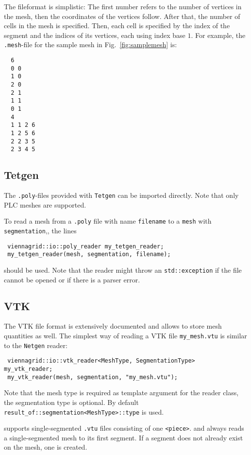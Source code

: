  The fileformat is simplistic: The first number refers to the number of vertices in the mesh, then the coordinates of the vertices follow. After that, the number of cells in the mesh is specified. Then, each cell is specified by the index of the segment and the indices of its vertices, each using index base $1$.
 For example, the \texttt{.mesh}-file for the sample mesh in Fig.~\ref{fig:samplemesh} is:
 \begin{verbatim}
  6
  0 0
  1 0
  2 0
  2 1
  1 1
  0 1
  4
  1 1 2 6
  1 2 5 6
  2 2 3 5
  2 3 4 5
 \end{verbatim}
 
 \subsection{Tetgen}
 The \texttt{.poly}-files provided with \texttt{Tetgen} \cite{tetgen} can be imported directly. Note that only PLC meshes are supported.

 To read a mesh from a \texttt{.poly} file with name \lstinline|filename| to a \lstinline|mesh| with \lstinline|segmentation|,, the lines
 \begin{lstlisting}
 viennagrid::io::poly_reader my_tetgen_reader;
 my_tetgen_reader(mesh, segmentation, filename);
 \end{lstlisting}
 should be used. Note that the reader might throw an \lstinline|std::exception| if the file cannot be opened or if there is a parser error.

 \subsection{VTK}
 The VTK file format is extensively documented \cite{VTKfileformat} and allows to store mesh quantities as well.
 The simplest way of reading a VTK file \lstinline|my_mesh.vtu| is similar to the \texttt{Netgen} reader:
 \begin{lstlisting}
 viennagrid::io::vtk_reader<MeshType, SegmentationType>  my_vtk_reader;
 my_vtk_reader(mesh, segmentation, "my_mesh.vtu");
 \end{lstlisting}
 Note that the mesh type is required as template argument for the reader class, the segmentation type is optional. By default \lstinline|result_of::segmentation<MeshType>::type| is used.

 {\ViennaGrid} supports single-segmented \lstinline|.vtu| files consisting of one \lstinline|<piece>|.
 and always reads a single-segmented mesh to its first segment. If a segment does not already exist on the mesh, one is created.

